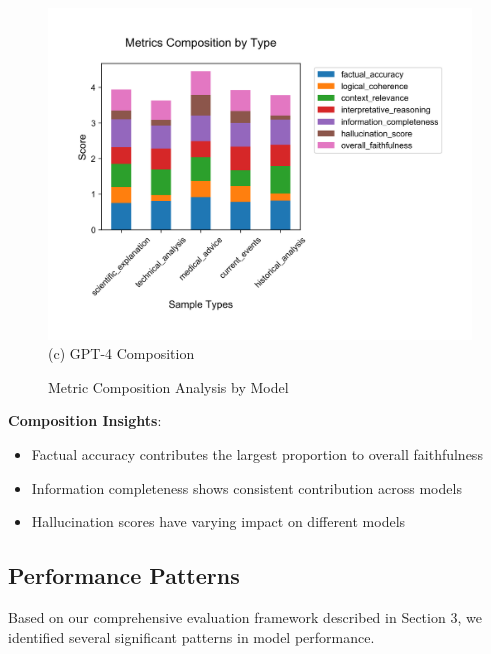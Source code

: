\begin{figure}[!htbp]
\begin{minipage}[t]{0.32\textwidth}
    \centering
    \includegraphics[width=\textwidth]{figures/visualization/metrics_stacked_bar_gpt-4.png}
    {\footnotesize (c) GPT-4 Composition}
\end{minipage}
\caption{Metric Composition Analysis by Model}
\label{fig:metrics_stacked_bars}
\end{figure}

\textbf{Composition Insights}:
\begin{itemize}
    \item Factual accuracy contributes the largest proportion to overall faithfulness
    \item Information completeness shows consistent contribution across models
    \item Hallucination scores have varying impact on different models
\end{itemize}

\subsection{Performance Patterns}
Based on our comprehensive evaluation framework described in Section 3, we identified several significant patterns in model performance.


